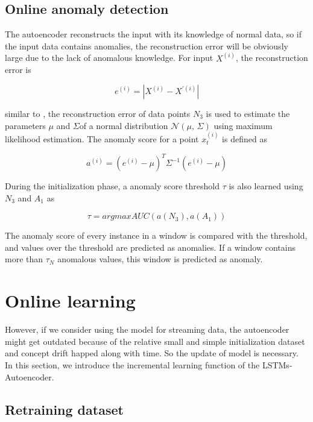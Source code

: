 \subsection{Online anomaly detection}
\label{anomalydetection}
The autoencoder reconstructs the input with its knowledge of normal data, so if the input data contains anomalies, the reconstruction error will be obviously large due to the lack of anomalous knowledge. For input $X^{(i)}$, the reconstruction error is 

\begin{equation} \label{eq:error}
e^{(i)}=\left| X^{(i)} - X^{'(i)} \right|
\end{equation}

similar to \cite{encdecad}, the reconstruction error of data points $N_3$ is used to estimate the parameters $\mu$ and $\Sigma$of a normal distribution $\mathcal{N}(\mu,\,\Sigma)$ using maximum likelihood estimation. The anomaly score for a point $x_t^{(i)}$ is defined as 

\begin{equation} \label{eq:score}
a^{(i)}={(e^{(i)}-\mu)}^{T}{\Sigma}^{-1}{(e^{(i)}-\mu)}
\end{equation}

During the initialization phase, a anomaly score threshold $\tau$ is also learned using $N_3$ and $A_1$ as

\begin{equation} \label{eq:threshold}
\tau = argmax AUC(a(N_3),a(A_1))
\end{equation}

The anomaly score of every instance in a window is compared with the threshold, and values over the threshold are predicted as anomalies. If a window contains more than $\tau_N$ anomalous values, this window is predicted as anomaly.




\section{Online learning}
\label{sec:Onlinelearning}
However, if we consider using the model for streaming data, the autoencoder might get outdated because of the relative small and simple initialization dataset and concept drift happed along with time. So the update of model is necessary. In this section, we introduce the incremental learning function of the LSTMs-Autoencoder.

\subsection{Retraining dataset}
\label{data}

